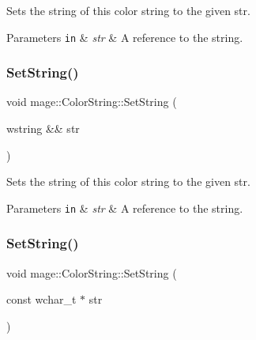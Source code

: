Sets the string of this color string to the given str.


\begin{DoxyParams}[1]{Parameters}
\mbox{\tt in}  & {\em str} & A reference to the string. \\
\hline
\end{DoxyParams}
\hypertarget{structmage_1_1_color_string_a62a374668fafc55281b97e6374027b25}{}\label{structmage_1_1_color_string_a62a374668fafc55281b97e6374027b25} 
\subsubsection{\texorpdfstring{Set\+String()}{SetString()}\hspace{0.1cm}{\footnotesize\ttfamily [2/3]}}
{\footnotesize\ttfamily void mage\+::\+Color\+String\+::\+Set\+String (\begin{DoxyParamCaption}\item[{wstring \&\&}]{str }\end{DoxyParamCaption})\hspace{0.3cm}{\ttfamily [noexcept]}}

Sets the string of this color string to the given str.


\begin{DoxyParams}[1]{Parameters}
\mbox{\tt in}  & {\em str} & A reference to the string. \\
\hline
\end{DoxyParams}
\hypertarget{structmage_1_1_color_string_a317caadad725b67ede68f1e474e47d3b}{}\label{structmage_1_1_color_string_a317caadad725b67ede68f1e474e47d3b} 
\subsubsection{\texorpdfstring{Set\+String()}{SetString()}\hspace{0.1cm}{\footnotesize\ttfamily [3/3]}}
{\footnotesize\ttfamily void mage\+::\+Color\+String\+::\+Set\+String (\begin{DoxyParamCaption}\item[{const wchar\+\_\+t $\ast$}]{str }\end{DoxyParamCaption})}

